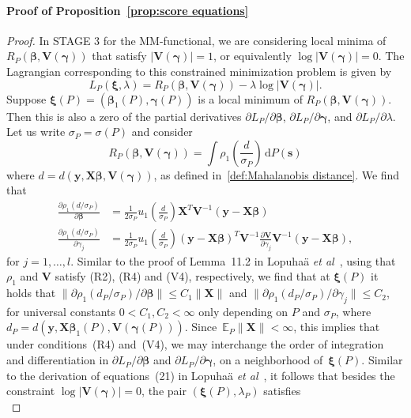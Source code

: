 \documentclass{article}
\numberwithin{equation}{section}
\theoremstyle{plain}
\newcommand{\bbeta}{\bm\beta}
\newcommand{\bxi}{\bm\xi}
\newcommand{\bgamma}{\bm\gamma}
\newcommand{\by}{\mathbf{y}}
\newcommand{\bs}{\mathbf{s}}
\newcommand{\bX}{\mathbf{X}}
\newcommand{\bV}{\mathbf{V}}
\newcommand{\E}{\mathbb{E}}
\begin{document}
\paragraph*{Proof of Proposition~\ref{prop:score equations}}
\begin{proof}
In STAGE 3 for the MM-functional, we are considering local minima
of $R_P(\bbeta,\bV(\bgamma))$ that satisfy $|\bV(\bgamma)|=1$,
or equivalently $\log|\bV(\bgamma)|=0$.
The Lagrangian corresponding to this constrained minimization problem
is given by
\[
L_P(\bxi,\lambda)
=
R_P(\bbeta,\bV(\bgamma))-
\lambda\log|\bV(\bgamma)|.
\]
Suppose $\bxi(P)=(\bbeta_1(P),\bgamma(P))$ is a local minimum of $R_P(\bbeta,\bV(\bgamma))$.
Then this is also a zero of the partial derivatives
$\partial L_P/\partial \bbeta$,
$\partial L_P/\partial \bgamma$,
and $\partial L_P/\partial \lambda$.
Let us write $\sigma_P=\sigma(P)$ and consider
\[
R_P(\bbeta,\bV(\bgamma))
=
\int
\rho_1\left(\frac{d}{\sigma_P}\right)\,\text{d}P(\bs)
\]
where $d=d(\by,\bX\bbeta,\bV(\bgamma))$, as defined in~\eqref{def:Mahalanobis distance}.
We find that
\[
\begin{split}
\frac{\partial\rho_1\left(d/\sigma_P\right)}{\partial\bbeta}
&=
\frac{1}{2\sigma_P}
u_1\left(\frac{d}{\sigma_P}\right)
\bX^T\bV^{-1}(\by-\bX\bbeta)\\
\frac{\partial\rho_1\left(d/\sigma_P\right)}{\partial\gamma_j}
&=
\frac{1}{2\sigma_P}
u_1\left(\frac{d}{\sigma_P}\right)
(\by-\bX\bbeta)^T\bV^{-1}
\frac{\partial \bV}{\partial \gamma_j}
\bV^{-1}(\by-\bX\bbeta),
\end{split}
\]
for $j=1,\ldots,l$.
Similar to the proof of Lemma~11.2 in Lopuha\"a \emph{et al}~\cite{lopuhaa-gares-ruizgazen2023},
using that~$\rho_1$ and $\bV$ satisfy (R2), (R4) and (V4), respectively,
we find that at $\bxi(P)$ it holds that
$\|\partial\rho_1\left(d_P/\sigma_P\right)/\partial\bbeta\|\leq C_1\|\bX\|$
and 
$\|\partial\rho_1\left(d_P/\sigma_P\right)/\partial\gamma_j\|\leq C_2$,
for universal constants $0<C_1,C_2<\infty$ only depending on $P$ and $\sigma_P$,
where $d_P=d(\by,\bX\bbeta_1(P),\bV(\bgamma(P)))$.
Since~$\E_P\|\bX\|<\infty$, this implies that under conditions~(R4) and~(V4), 
we may interchange the order of integration and differentiation
in $\partial L_P/\partial \bbeta$ and $\partial L_P/\partial \bgamma$, on a neighborhood of~$\bxi(P)$.
Similar to the derivation of equations~(21) in Lopuha\"a \textit{et al}~\cite{lopuhaa-gares-ruizgazen2023},
it follows that besides the constraint $\log|\bV(\bgamma)|=0$,
the pair $(\bxi(P),\lambda_P)$ satisfies
\begin{equation}

\end{equation}
\end{proof}
\end{document}
